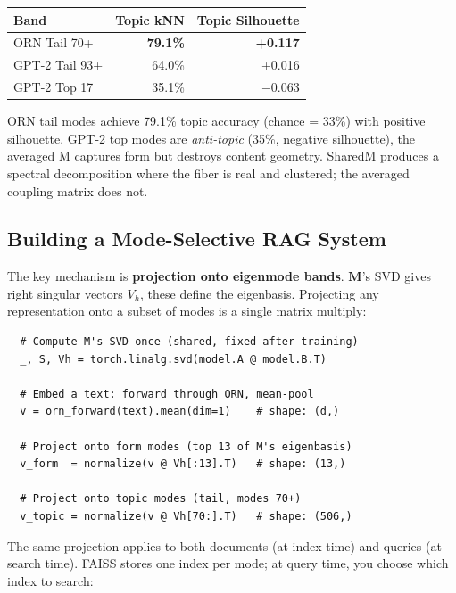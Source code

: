 \documentclass[11pt, a4paper]{article}
\newcommand{\M}{\mathbf{M}}
\theoremstyle{remark}
\begin{document}
\begin{center}\small
\begin{tabular}{@{}lrr@{}}
\toprule
Band & Topic kNN & Topic Silhouette \\
\midrule
ORN Tail 70+ & \textbf{79.1\%} & \textbf{+0.117} \\
GPT-2 Tail 93+ & 64.0\% & +0.016 \\
GPT-2 Top 17 & 35.1\% & $-$0.063 \\
\bottomrule
\end{tabular}
\end{center}

ORN tail modes achieve 79.1\% topic accuracy (chance = 33\%) with positive silhouette.
GPT-2 top modes are \emph{anti-topic} (35\%, negative silhouette), the averaged M captures form but destroys content geometry.
SharedM produces a spectral decomposition where the fiber is real and clustered; the averaged coupling matrix does not.

\subsection{Building a Mode-Selective RAG System}

The key mechanism is \textbf{projection onto eigenmode bands}.
$\M$'s SVD gives right singular vectors $V_h$, these define the eigenbasis.
Projecting any representation onto a subset of modes is a single matrix multiply:

\begin{verbatim}
  # Compute M's SVD once (shared, fixed after training)
  _, S, Vh = torch.linalg.svd(model.A @ model.B.T)

  # Embed a text: forward through ORN, mean-pool
  v = orn_forward(text).mean(dim=1)    # shape: (d,)

  # Project onto form modes (top 13 of M's eigenbasis)
  v_form  = normalize(v @ Vh[:13].T)   # shape: (13,)

  # Project onto topic modes (tail, modes 70+)
  v_topic = normalize(v @ Vh[70:].T)   # shape: (506,)
\end{verbatim}

The same projection applies to both documents (at index time) and queries (at search time).
FAISS stores one index per mode; at query time, you choose which index to search:
\end{document}
